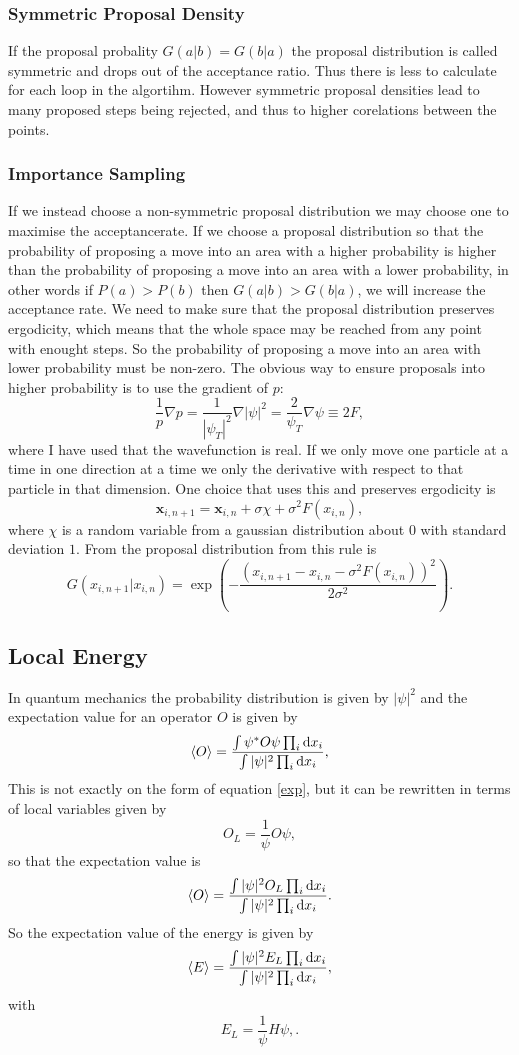 \documentclass[a4paper,English,10pt]{article}
\newcommand{\bb}[1]{\boldsymbol{#1}}
\newcommand{\dd}{\mathrm{d}}
\newcommand{\be}{\begin{equation}}
\newcommand{\ee}{\end{equation}}
\newcommand{\f}{\frac}
\renewcommand{\braket}{\Braket}
\begin{document}
  

\subsubsection{Symmetric Proposal Density}

If the proposal probality $G(a|b) = G(b|a)$ the proposal distribution is called symmetric and drops out of the acceptance ratio.
Thus there is less to calculate for each loop in the algortihm. However symmetric proposal densities lead to many proposed steps being rejected,
and thus to higher corelations between the points.


\subsubsection{Importance Sampling}

If we instead choose a non-symmetric proposal distribution we may choose one to maximise the acceptancerate.
If we choose a proposal distribution so that the probability of proposing a move into an area with a higher probability is higher than
the probability of proposing a move into an area with a lower probability, in other words
if $P(a)>P(b)$ then $G(a|b)>G(b|a)$, we will increase the acceptance rate. We need to make sure that the proposal distribution preserves ergodicity,
which means that the whole space may be reached from any point with enought steps. So the probability of proposing a move into an area with lower probability must be non-zero.
The obvious way to ensure proposals into higher probability is to use the gradient of $p$:
\be
\f{1}{p}\nabla p = \f{1}{|\psi_T|^2}\nabla|\psi|^2 = \f{2}{\psi_T}\nabla\psi \equiv 2F, \label{eq:qforce} 
\ee
where I have used that the wavefunction is real. If we only move one particle at a time in one direction at a time we only the derivative with respect to
that particle in that dimension. 
One choice that uses this and preserves ergodicity is
\be
\bb{x}_{i,n+1} = \bb{x}_{i,n} + \sigma \chi + \sigma^2F(x_{i,n}),\label{eq:prop}
\ee
where $\chi$ is a random variable from a gaussian distribution about $0$ with standard deviation $1$.
From \cite{mortenbok} the proposal distribution from this rule is
\be
G(x_{i,n+1}|x_{i,n}) = \exp\left(-\f{(x_{i,n+1} - x_{i,n} - \sigma^2F(x_{i,n}))^2}{2\sigma^2}\right).
\ee
\subsection{Local Energy}
In quantum mechanics the probability distribution is given by $|\psi|^2$ and the expectation value for an operator $O$ is given by
\be
\braket{O} = \f{\int\psi^*O\psi\prod_i\dd x_i}{\int|\psi|^2\prod_i\dd x_i},
\ee
This is not exactly on the form of equation \ref{exp}, but it can be rewritten in terms of local variables given by
\be
O_L = \f{1}{\psi}O\psi, \label{localdef}
\ee
so that the expectation value is
\be
\braket{O} =  \f{\int|\psi|^2O_L\prod_i\dd x_i}{\int|\psi|^2\prod_i\dd x_i}.
\ee
So the expectation value of the energy is given by
\be
\braket{E} =  \f{\int|\psi|^2E_L\prod_i\dd x_i}{\int|\psi|^2\prod_i\dd x_i},
\ee
with
\be
E_L = \f{1}{\psi}H\psi, \label{localEdef}.
\ee
\end{document}
